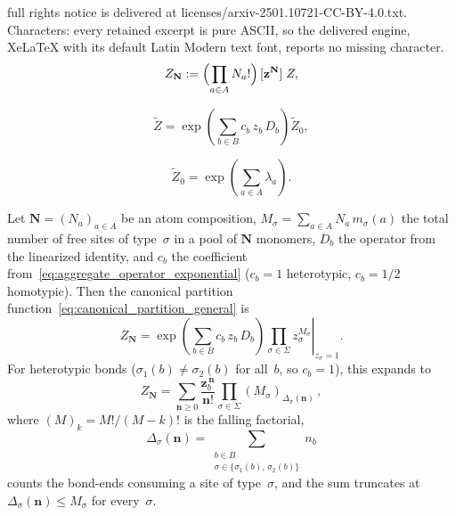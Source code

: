 \documentclass[10pt,a4paper]{amsart}
\newcommand{\GFensemble}{Z}
\begin{document}
full rights notice is delivered at licenses/arxiv-2501.10721-CC-BY-4.0.txt. Characters: every retained excerpt is pure ASCII, so the delivered engine, XeLaTeX with its default Latin Modern text font, reports no missing character.
\begin{equation}\label{eq:canonical_partition_general}
\GFensemble_{\mathbf{N}}
:= \Bigl(\prod_{a\in A} N_a!\Bigr)\,[\mathbf{z}^{\mathbf{N}}]\;\GFensemble,
\end{equation}

\begin{equation}\label{eq:aggregate_operator_exponential}
\widetilde{\GFensemble}
= \exp\!\left(\sum_{b\in B} c_b\,z_b\,D_b\right)\widetilde{\GFensemble}_0,
\end{equation}

\begin{equation}\label{eq:Z0_explicit}
\widetilde{\GFensemble}_0 = \exp\!\left(\sum_{a\in A}\lambda_a\right).
\end{equation}

\begin{theorem}
\label{thm:canonical_cyclic}
Let $\mathbf{N}=(N_a)_{a\in A}$ be an atom composition,
$M_\sigma = \sum_{a\in A} N_a\,m_\sigma(a)$ the total number of free sites of type~$\sigma$ in a pool of $\mathbf{N}$ monomers,
$D_b$ the operator from the linearized identity, and $c_b$ the coefficient from~\eqref{eq:aggregate_operator_exponential} ($c_b=1$ heterotypic, $c_b=1/2$ homotypic).
Then the canonical partition function~\eqref{eq:canonical_partition_general} is
\begin{equation}\label{eq:canonical_cyclic_operator}
\GFensemble_{\mathbf{N}}
= \left.\exp\!\left(\sum_{b\in B} c_b\,z_b\,D_b\right)
\prod_{\sigma\in\Sigma} z_\sigma^{M_\sigma}\right|_{z_\sigma=1}.
\end{equation}
For heterotypic bonds ($\sigma_1(b)\neq\sigma_2(b)$ for all~$b$, so $c_b=1$), this expands to
\begin{equation}\label{eq:canonical_cyclic_explicit}
\GFensemble_{\mathbf{N}}
= \sum_{\mathbf{n}\ge 0}
\frac{\mathbf{z}_b^{\,\mathbf{n}}}{\mathbf{n}!}
\prod_{\sigma\in\Sigma}(M_\sigma)_{\Delta_\sigma(\mathbf{n})}\,,
\end{equation}
where $(M)_k = M!/(M-k)!$ is the falling factorial,
\[
\Delta_\sigma(\mathbf{n}) = \sum_{\substack{b\in B\\ \sigma\in\{\sigma_1(b),\,\sigma_2(b)\}}} n_b
\]
counts the bond-ends consuming a site of type~$\sigma$,
and the sum truncates at $\Delta_\sigma(\mathbf{n})\le M_\sigma$ for every~$\sigma$.
\end{theorem}
\end{document}
